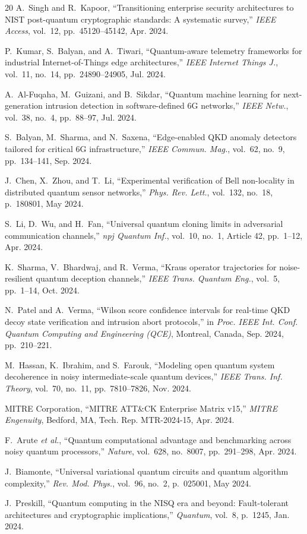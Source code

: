\documentclass[journal,10pt]{IEEEtran}
\begin{document}
\begin{thebibliography}{20}
A.~Singh and R.~Kapoor, ``Transitioning enterprise security architectures to NIST post-quantum cryptographic standards: A systematic survey,'' \emph{IEEE Access}, vol.~12, pp.~45120--45142, Apr. 2024.

P.~Kumar, S.~Balyan, and A.~Tiwari, ``Quantum-aware telemetry frameworks for industrial Internet-of-Things edge architectures,'' \emph{IEEE Internet Things J.}, vol.~11, no.~14, pp.~24890--24905, Jul. 2024.

A.~Al-Fuqaha, M.~Guizani, and B.~Sikdar, ``Quantum machine learning for next-generation intrusion detection in software-defined 6G networks,'' \emph{IEEE Netw.}, vol.~38, no.~4, pp.~88--97, Jul. 2024.

S.~Balyan, M.~Sharma, and N.~Saxena, ``Edge-enabled QKD anomaly detectors tailored for critical 6G infrastructure,'' \emph{IEEE Commun. Mag.}, vol.~62, no.~9, pp.~134--141, Sep. 2024.

J.~Chen, X.~Zhou, and T.~Li, ``Experimental verification of Bell non-locality in distributed quantum sensor networks,'' \emph{Phys. Rev. Lett.}, vol.~132, no.~18, p.~180801, May 2024.

S.~Li, D.~Wu, and H.~Fan, ``Universal quantum cloning limits in adversarial communication channels,'' \emph{npj Quantum Inf.}, vol.~10, no.~1, Article 42, pp.~1--12, Apr. 2024.

K.~Sharma, V.~Bhardwaj, and R.~Verma, ``Kraus operator trajectories for noise-resilient quantum deception channels,'' \emph{IEEE Trans. Quantum Eng.}, vol.~5, pp.~1--14, Oct. 2024.

N.~Patel and A.~Verma, ``Wilson score confidence intervals for real-time QKD decoy state verification and intrusion abort protocols,'' in \emph{Proc. IEEE Int. Conf. Quantum Computing and Engineering (QCE)}, Montreal, Canada, Sep. 2024, pp.~210--221.

M.~Hassan, K.~Ibrahim, and S.~Farouk, ``Modeling open quantum system decoherence in noisy intermediate-scale quantum devices,'' \emph{IEEE Trans. Inf. Theory}, vol.~70, no.~11, pp.~7810--7826, Nov. 2024.

MITRE Corporation, ``MITRE ATT\&CK Enterprise Matrix v15,'' \emph{MITRE Engenuity}, Bedford, MA, Tech. Rep. MTR-2024-15, Apr. 2024.

F.~Arute \emph{et al.}, ``Quantum computational advantage and benchmarking across noisy quantum processors,'' \emph{Nature}, vol.~628, no.~8007, pp.~291--298, Apr. 2024.

J.~Biamonte, ``Universal variational quantum circuits and quantum algorithm complexity,'' \emph{Rev. Mod. Phys.}, vol.~96, no.~2, p.~025001, May 2024.

J.~Preskill, ``Quantum computing in the NISQ era and beyond: Fault-tolerant architectures and cryptographic implications,'' \emph{Quantum}, vol.~8, p.~1245, Jan. 2024.

\end{thebibliography}
\end{document}
